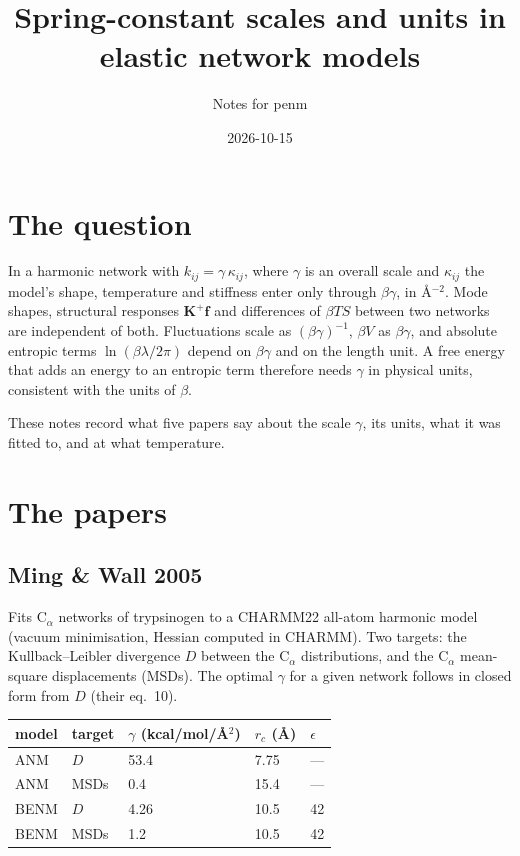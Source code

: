 \documentclass[11pt]{article}
\title{Spring-constant scales and units in elastic network models}
\author{Notes for penm}
\date{2026-10-15}
\begin{document}
\maketitle

\section{The question}

In a harmonic network with $k_{ij} = \gamma\,\kappa_{ij}$, where $\gamma$ is an overall
scale and $\kappa_{ij}$ the model's shape, temperature and stiffness enter only through
$\beta\gamma$, in \AA$^{-2}$.
Mode shapes, structural responses $\mathbf{K}^{+}\mathbf{f}$ and differences of
$\beta T S$ between two networks are independent of both.
Fluctuations scale as $(\beta\gamma)^{-1}$, $\beta V$ as $\beta\gamma$, and absolute entropic
terms $\ln(\beta\lambda/2\pi)$ depend on $\beta\gamma$ and on the length unit.
A free energy that adds an energy to an entropic term therefore needs $\gamma$ in physical
units, consistent with the units of $\beta$.

These notes record what five papers say about the scale $\gamma$, its units, what it was
fitted to, and at what temperature.

\section{The papers}

\subsection*{Ming \& Wall 2005 \cite{ming2005}}

Fits C$_\alpha$ networks of trypsinogen to a CHARMM22 all-atom harmonic model (vacuum
minimisation, Hessian computed in CHARMM).
Two targets: the Kullback--Leibler divergence $D$ between the C$_\alpha$ distributions,
and the C$_\alpha$ mean-square displacements (MSDs).
The optimal $\gamma$ for a given network follows in closed form from $D$ (their eq.~10).

\begin{center}
\begin{tabular}{lllll}
\toprule
model & target & $\gamma$ (kcal/mol/\AA$^2$) & $r_c$ (\AA) & $\epsilon$ \\
\midrule
ANM  & $D$   & 53.4 & 7.75 & --- \\
ANM  & MSDs  & 0.4  & 15.4 & --- \\
BENM & $D$   & 4.26 & 10.5 & 42 \\
BENM & MSDs  & 1.2  & 10.5 & 42 \\
\bottomrule
\end{tabular}
\end{center}
\end{document}
